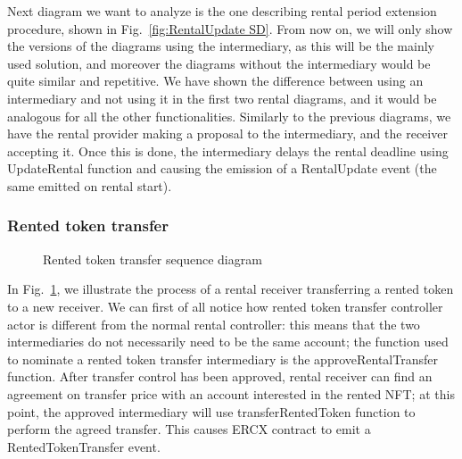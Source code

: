 \documentclass[english, LaM, oneside]{sapthesis}%
\begin{document}
Next diagram we want to analyze is the one describing rental period extension procedure, shown in Fig.~\ref{fig:RentalUpdate SD}. From now on, we will only show the versions of the diagrams using the intermediary, as this will be the mainly used solution, and moreover the diagrams without the intermediary would be quite similar and repetitive. We have shown the difference between using an intermediary and not using it in the first two rental diagrams, and it would be analogous for all the other functionalities.\newline
Similarly to the previous diagrams, we have the rental provider making a proposal to the intermediary, and the receiver accepting it. Once this is done, the intermediary delays the rental deadline using UpdateRental function and causing the emission of a RentalUpdate event (the same emitted on rental start).\newline
\bigskip

\subsubsection{Rented token transfer}

\begin{figure}
    \centering
        \begin{adjustbox}{width=1\textwidth}
        \end{adjustbox}
    \caption{Rented token transfer sequence diagram}
    \label{fig:RentedTokenTransfer SD}
\end{figure}

In Fig.~\ref{fig:RentedTokenTransfer SD}, we illustrate the process of a rental receiver transferring a rented token to a new receiver. We can first of all notice how rented token transfer controller actor is different from the normal rental controller: this means that the two intermediaries do not necessarily need to be the same account; the function used to nominate a rented token transfer intermediary is the approveRentalTransfer function. After transfer control has been approved, rental receiver can find an agreement on transfer price with an account interested in the rented NFT; at this point, the approved intermediary will use transferRentedToken function to perform the agreed transfer. This causes ERCX contract to emit a RentedTokenTransfer event.\newline
\bigskip
\end{document}
